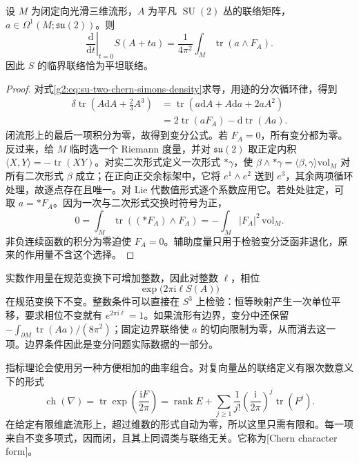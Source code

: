 \begin{proposition}\label{g2:prop:chern-simons-variation}
	设 \(M\) 为闭定向光滑三维流形，\(A\) 为平凡 \(\operatorname{SU}(2)\) 丛的联络矩阵，\(a\in\Omega^1(M;\mathfrak{su}(2))\)。则
	\begin{equation}\label{g2:eq:chern-simons-variation}
		\left.\frac{\mathrm d}{\mathrm dt}\right|_{t=0}S(A+ta)
		=\frac1{4\pi^2}\int_M\operatorname{tr}(a\wedge F_A).
	\end{equation}
	因此 \(S\) 的临界联络恰为平坦联络。
\end{proposition}
\begin{proof}
	对式\eqref{g2:eq:su-two-chern-simons-density}求导，用迹的分次循环律，得到
	\[
	\begin{aligned}
		\delta\operatorname{tr}\left(A\mathrm dA+\frac23A^3\right)
		&=\operatorname{tr}(a\mathrm dA+A\mathrm da+2aA^2)\\
		&=2\operatorname{tr}(aF_A)-\mathrm d\operatorname{tr}(Aa).
	\end{aligned}
	\]
	闭流形上的最后一项积分为零，故得到变分公式。若 \(F_A=0\)，所有变分都为零。反过来，给 \(M\) 临时选一个 Riemann 度量，并对 \(\mathfrak{su}(2)\) 取正定内积 \(\langle X,Y\rangle=-\operatorname{tr}(XY)\)。对实二次形式定义一次形式 \(*\gamma\)，使 \(\beta\wedge *\gamma=\langle\beta,\gamma\rangle\mathrm{vol}_M\) 对所有二次形式 \(\beta\) 成立；在正向正交余标架中，它将 \(e^1\wedge e^2\) 送到 \(e^3\)，其余两项循环处理，故逐点存在且唯一。对 Lie 代数值形式逐个系数应用它。若处处驻定，可取 \(a=*F_A\)。因为一次与二次形式交换时符号为正，
	\[
		0=\int_M\operatorname{tr}((*F_A)\wedge F_A)=-\int_M|F_A|^2\,\mathrm{vol}_M.
	\]
	非负连续函数的积分为零迫使 \(F_A=0\)。辅助度量只用于检验变分泛函非退化，原来的作用量不含这个选择。
\end{proof}

实数作用量在规范变换下可增加整数，因此对整数 \(\ell\)，相位
\[
	\exp\bigl(2\pi\mathrm i\ell S(A)\bigr)
\]
在规范变换下不变。整数条件可以直接在 \(S^3\) 上检验：恒等映射产生一次单位平移，要求相位不变就有 \(e^{2\pi\mathrm i\ell}=1\)。如果流形有边界，变分中还保留 \(-\int_{\partial M}\operatorname{tr}(Aa)/(8\pi^2)\)；固定边界联络使 \(a\) 的切向限制为零，从而消去这一项。边界条件因此是变分问题实际数据的一部分。

\ProseParagraphBreak

指标理论会使用另一种方便相加的曲率组合。对复向量丛的联络定义有限次数意义下的形式
\begin{equation}\label{g2:eq:chern-character-curvature-form}
	\operatorname{ch}(\nabla)=\operatorname{tr}\exp\left(\frac{\mathrm iF}{2\pi}\right)
	=\operatorname{rank}E+\sum_{j\ge1}\frac1{j!}\left(\frac{\mathrm i}{2\pi}\right)^j\operatorname{tr}(F^j).
\end{equation}
在给定有限维底流形上，超过维数的形式自动为零，所以这里只需有限和。每一项来自不变多项式，因而闭，且其上同调类与联络无关。它称为[Chern character form]。

